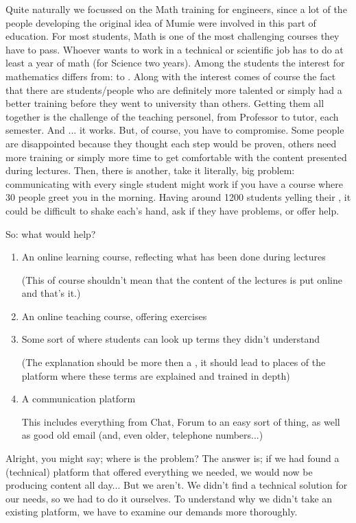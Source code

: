 \documentclass{webpage}
\begin{document}
Quite naturally we focussed on the Math training for engineers, since a lot of the people
developing the original idea of Mumie were involved in this part of education.
For most students, Math is one of the most challenging courses they have to pass. Whoever wants 
to work in a technical or scientific job has to do at least a year of math (for Science two years).
Among the students the interest for mathematics differs from:  to . Along with the interest comes of course
the fact that there are students/people who are definitely more talented or simply had a better 
training before they went to university than others. Getting them all together is the challenge 
of the teaching personel, from Professor to tutor, each semester. And ... it works. But, of
course, you have to compromise. Some people are disappointed because they thought each step would 
be proven, others need more training or simply more time to get comfortable with the content
presented during lectures. Then, there is another, take it literally, big problem: communicating
with every single student might work if you have a course where 30 people greet you in the morning.
Having around 1200 students yelling their , it could be difficult to shake each's 
hand, ask if they have problems, or offer help.

So: what would help?

\begin{enumerate}
\item An online learning course, reflecting what has been done during lectures

(This of course shouldn't mean that the content of the lectures is put online and that's it.)
\item An online teaching course, offering exercises
\item Some sort of  where students can look up terms they didn't understand

(The explanation should be more then a , it should lead to places of the platform
where these terms are explained and trained in depth)
\item A communication platform

This includes everything from Chat, Forum to an easy  sort of thing, as well as
good old email (and, even older, telephone numbers...)
\end{enumerate}
Alright, you might say; where is the problem? The answer is; if we had found a (technical) platform 
that offered everything we needed, we would now be producing content all day... But we aren't.
We didn't find a technical solution for our needs, so we had to do it ourselves. To understand
why we didn't take an existing platform, we have to examine our demands more thoroughly.
\end{document}
